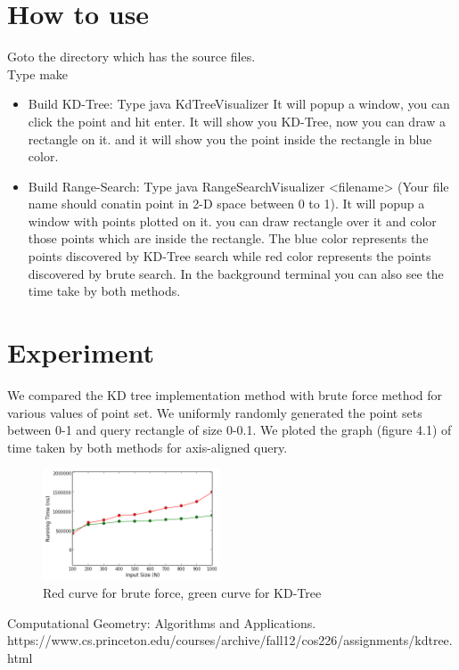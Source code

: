 \documentclass[paper=a4, fontsize=11pt]{scrartcl}
\numberwithin{equation}{section}		%
\numberwithin{figure}{section}			%
\numberwithin{table}{section}				%
\begin{document}
\pagebreak
\section{How to use}
Goto the directory which has the source files.\\
Type make
\begin{itemize}
\item Build KD-Tree: Type java KdTreeVisualizer 
  It will popup a window, you can click the point and hit enter.
  It will show you KD-Tree, now you can draw a rectangle on it.
  and it will show you the point inside the rectangle in blue color.
  \item Build Range-Search: Type java RangeSearchVisualizer <filename> (Your file name should conatin point in 2-D space between 0 to 1). It will popup a window with points plotted on it. you can draw rectangle over it and color those points which are inside the rectangle. The blue color represents the points discovered by KD-Tree search while red color represents the points discovered by brute search. In the background terminal you can also see the time take by both methods. 
  
\end{itemize}

\section{Experiment}
We compared the KD tree implementation method with brute force method for various values of point set. We uniformly randomly generated the point sets between 0-1 and query rectangle of size 0-0.1. We ploted the graph (figure 4.1) of time taken by both methods for axis-aligned query.

\begin{figure}[H]
\centering
\includegraphics[width=0.47\textwidth]{index.png}
\caption{Red curve for brute force, green curve for KD-Tree}
\end{figure}
 


\begin{thebibliography}{9}

Computational Geometry: Algorithms and Applications.
\bibitem{}
https://www.cs.princeton.edu/courses/archive/fall12/cos226/assignments/kdtree.html
\end{thebibliography}
\end{document}
